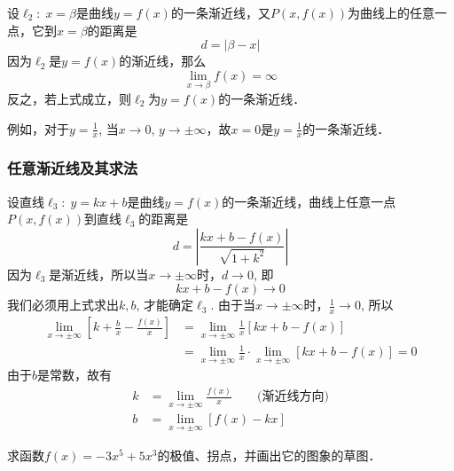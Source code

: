 设$\ell_2:\; x=\beta$是曲线$y=f(x)$的一条渐近线，又$P(x,f(x))$为曲线上的任意一点，它到$x=\beta$的距离是
\[d=|\beta-x|\]
因为$\ell_2$是$y=f(x)$的渐近线，那么
\[\lim_{x\to\beta} f (x) =\infty\]
反之，若上式成立，则$\ell_2$为$y=f(x)$的一条渐近线．

例如，对于$y=\frac{1}{x}$, 当$x\to 0$, $y\to \pm\infty$，故$x=0$是$y=\frac{1}{x}$的一条渐近线．

\subsubsection{任意渐近线及其求法}

设直线$\ell_3:\; y=kx+b$是曲线$y=f(x)$的一条渐近线，曲线上任意一点$P(x,f(x))$到直线$\ell_3$的距离是
\[d=\left|\frac{kx+b-f(x)}{\sqrt{1+k^2}}\right|\]
因为$\ell_3$是渐近线，所以当$x\to\pm\infty$时，$d\to 0$, 即
\[kx+b-f (x) \to 0\]
我们必须用上式求出$k,b$, 才能确定$\ell_3$. 由于当$x\to\pm\infty$时，$\frac{1}{x}\to 0$, 所以
\begin{align*}
\lim_{x\to\pm\infty}\left[k+\frac{b}{x}-\frac{f(x)}{x}\right]&=\lim_{x\to\pm\infty}\frac{1}{x}[kx+b-f(x)]\\
&=\lim_{x\to\pm\infty}\frac{1}{x}\cdot \lim_{x\to\pm\infty}[kx+b-f(x)]=0
\end{align*}
由于$b$是常数，故有
\begin{align}
    k&=\lim_{x\to\pm\infty}\frac{f(x)}{x}\qquad \text{(渐近线方向)}\\
b&=\lim_{x\to\pm\infty}[f(x)-kx]
\end{align}

\begin{example}
求函数$f(x)=-3x^5+5x^3$的极值、拐点，并画出它的图象的草图．
\end{example}

